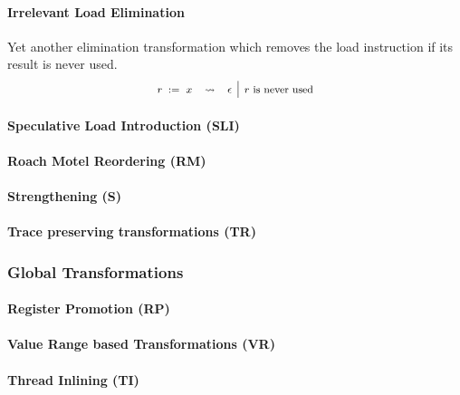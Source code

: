 \paragraph{Irrelevant Load Elimination}

Yet another elimination transformation 
which removes the load instruction if its 
result is never used. 
%
\[\def\arraystretch{1.4}\footnotesize
  \begin{array}{ccc|l} 

      \readInst{}{r}{x} 
    & \leadsto 
    & \epsInst
    & \text{$r$ is never used}  \\ 

  \end{array}
\]

\paragraph{Speculative Load Introduction (SLI)}

\paragraph{Roach Motel Reordering (RM)}

\paragraph{Strengthening (S)}

\paragraph{Trace preserving transformations (TR)}

\subsubsection{Global Transformations}

\paragraph{Register Promotion (RP)}

\paragraph{Value Range based Transformations (VR)}

\paragraph{Thread Inlining (TI)}

